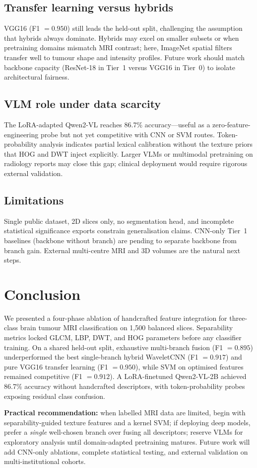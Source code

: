 \documentclass[11pt]{article}
\begin{document}
\subsection{Transfer learning versus hybrids}
VGG16 (F1 $=0.950$) still leads the held-out split, challenging the assumption that hybrids always dominate.
Hybrids may excel on smaller subsets or when pretraining domains mismatch MRI contrast; here, ImageNet spatial filters transfer well to tumour shape and intensity profiles.
Future work should match backbone capacity (ResNet-18 in Tier~1 versus VGG16 in Tier~0) to isolate architectural fairness.

\subsection{VLM role under data scarcity}
The LoRA-adapted Qwen2-VL reaches 86.7\% accuracy---useful as a zero-feature-engineering probe but not yet competitive with CNN or SVM routes.
Token-probability analysis indicates partial lexical calibration without the texture priors that HOG and DWT inject explicitly.
Larger VLMs or multimodal pretraining on radiology reports may close this gap; clinical deployment would require rigorous external validation.

\subsection{Limitations}
Single public dataset, 2D slices only, no segmentation head, and incomplete statistical significance exports constrain generalisation claims.
CNN-only Tier~1 baselines (backbone without branch) are pending to separate backbone from branch gain.
External multi-centre MRI and 3D volumes are the natural next steps.

\section{Conclusion}


We presented a four-phase ablation of handcrafted feature integration for three-class brain tumour MRI classification on 1{,}500 balanced slices.
Separability metrics locked GLCM, LBP, DWT, and HOG parameters before any classifier training.
On a shared held-out split, exhaustive multi-branch fusion (F1 $=0.895$) underperformed the best single-branch hybrid WaveletCNN (F1 $=0.917$) and pure VGG16 transfer learning (F1 $=0.950$), while SVM on optimised features remained competitive (F1 $=0.912$).
A LoRA-finetuned Qwen2-VL-2B achieved 86.7\% accuracy without handcrafted descriptors, with token-probability probes exposing residual class confusion.

\textbf{Practical recommendation:} when labelled MRI data are limited, begin with separability-guided texture features and a kernel SVM; if deploying deep models, prefer a \emph{single} well-chosen branch over fusing all descriptors; reserve VLMs for exploratory analysis until domain-adapted pretraining matures.
Future work will add CNN-only ablations, complete statistical testing, and external validation on multi-institutional cohorts.
\end{document}
